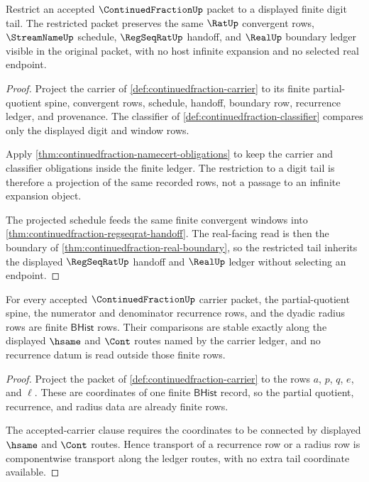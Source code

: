 \begin{theorem}
\label{thm:continuedfraction-digit-tail-stability}
Restrict an accepted $\ContinuedFractionUp$ packet to a displayed finite digit
tail. The restricted packet preserves the same $\RatUp$ convergent rows,
$\StreamNameUp$ schedule, $\RegSeqRatUp$ handoff, and $\RealUp$ boundary ledger
visible in the original packet, with no host infinite expansion and no selected
real endpoint.
\end{theorem}
\begin{proof}
Project the carrier of \autoref{def:continuedfraction-carrier} to its finite
partial-quotient spine, convergent rows, schedule, handoff, boundary row,
recurrence ledger, and provenance. The classifier of
\autoref{def:continuedfraction-classifier} compares only the displayed digit
and window rows.

Apply \autoref{thm:continuedfraction-namecert-obligations} to keep the carrier
and classifier obligations inside the finite ledger. The restriction to a digit
tail is therefore a projection of the same recorded rows, not a passage to an
infinite expansion object.

The projected schedule feeds the same finite convergent windows into
\autoref{thm:continuedfraction-regseqrat-handoff}. The real-facing read is then
the boundary of \autoref{thm:continuedfraction-real-boundary}, so the restricted
tail inherits the displayed $\RegSeqRatUp$ handoff and $\RealUp$ ledger without
selecting an endpoint.
\end{proof}

\begin{theorem}
\label{thm:continuedfraction-obligation-recurrence-ledger}
For every accepted $\ContinuedFractionUp$ carrier packet, the partial-quotient
spine, the numerator and denominator recurrence rows, and the dyadic radius rows
are finite $\mathsf{BHist}$ rows. Their comparisons are stable exactly along the
displayed $\hsame$ and $\Cont$ routes named by the carrier ledger, and no
recurrence datum is read outside those finite rows.
\end{theorem}
\begin{proof}
Project the packet of \autoref{def:continuedfraction-carrier} to the rows
$a$, $p$, $q$, $e$, and $\ell$. These are coordinates of one finite
$\mathsf{BHist}$ record, so the partial quotient, recurrence, and radius data
are already finite rows.

The accepted-carrier clause requires the coordinates to be connected by
displayed $\hsame$ and $\Cont$ routes. Hence transport of a recurrence row or a
radius row is componentwise transport along the ledger routes, with no extra
tail coordinate available.
\end{proof}

